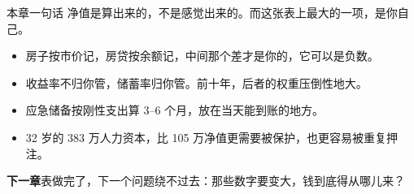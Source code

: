 \begin{takeaway}{本章一句话}
净值是算出来的，不是感觉出来的。而这张表上最大的一项，是你自己。

\begin{itemize}
  \item 房子按市价记，房贷按余额记，中间那个差才是你的，它可以是负数。
  \item 收益率不归你管，储蓄率归你管。前十年，后者的权重压倒性地大。
  \item 应急储备按刚性支出算 3–6 个月，放在当天能到账的地方。
  \item 32 岁的 383 万人力资本，比 105 万净值更需要被保护，也更容易被重复押注。
\end{itemize}

\end{takeaway}

\begin{bridgebox}
\textbf{下一章}表做完了，下一个问题绕不过去：那些数字要变大，钱到底得从哪儿来？
\end{bridgebox}

